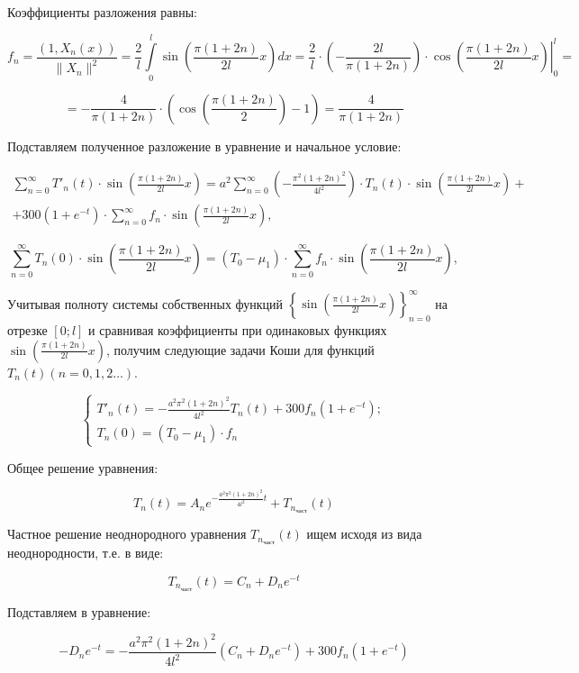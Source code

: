 Коэффициенты разложения равны:

$$f_{n} = \frac{(1, X_{n}(x))}{\|X_{n}\|^{2}} = \frac{2}{l} \int\limits_0^l \sin \left( \frac{\pi(1 + 2n)}{2l}x \right)dx = \frac{2}{l} \cdot \left( - \frac{2l}{\pi (1 + 2n)} \right) \cdot \left. \cos \left( \frac{\pi(1 + 2n)}{2l}x \right) \right|_0^l=$$

$$ = - \frac{4}{\pi(1 + 2n)} \cdot \left( \cos \left( \frac{\pi(1 + 2n)}{2} \right) - 1 \right) = \frac{4}{\pi(1 + 2n)}$$

Подставляем полученное разложение в уравнение и начальное условие:

\begin{multline*}
\sum_{n=0}^{\infty}T'_{n}(t)\cdot \sin \left( \frac{\pi(1 + 2n)}{2l}x \right) = a^{2}\sum_{n=0}^{\infty} \left( -\frac{\pi^{2}(1 + 2n)^{2}}{4l^{2}} \right) \cdot T_{n}(t) \cdot \sin \left( \frac{\pi(1 + 2n)}{2l}x \right) + \\
+ 300(1 + e^{-t}) \cdot \sum_{n=0}^{\infty} f_{n} \cdot \sin \left( \frac{\pi(1 + 2n)}{2l}x \right),
\end{multline*}

$$\sum_{n=0}^{\infty}T_{n}(0) \cdot \sin \left( \frac{\pi(1 + 2n)}{2l}x \right) = (T_{0} - \mu_{1}) \cdot \sum_{n=0}^{\infty} f_{n} \cdot \sin \left( \frac{\pi(1 + 2n)}{2l}x \right),$$

Учитывая полноту системы собственных функций $\left\{ \sin \left( \frac{\pi (1 + 2n)}{2l}x \right)  \right\}_{n=0}^{\infty}$ на отрезке $[0; l]$ и сравнивая коэффициенты при одинаковых функциях $\sin \left( \frac{\pi (1 + 2n)}{2l}x \right)$, получим следующие задачи Коши для функций $T_{n}(t) (n=0,1,2\ldots).$

$$
\begin{cases}
T'_{n}(t) = - \frac{a^{2}\pi^{2}(1 + 2n)^{2}}{4l^{2}}T_{n}(t) + 300f_{n}(1 + e^{-t});\\
T_{n}(0) = (T_{0} - \mu_{1}) \cdot f_{n}
\end{cases}
$$

Общее решение уравнения:

$$T_{n}(t) = A_{n}e^{- \frac{a^{2}\pi^{2}(1 + 2n)^{2}}{4l^{2}}t} + T_{n_{\text{част}}}(t)$$

Частное решение неоднородного уравнения $T_{n_{\text{част}}}(t)$ ищем исходя из вида неоднородности, т.е. в виде:  

$$T_{n_{\text{част}}}(t) = C_{n} + D_{n}e^{-t}$$

Подставляем в уравнение:

$$-D_{n}e^{-t} = -\frac{a^{2}\pi^{2}(1 + 2n)^{2}}{4l^{2}}\left( C_{n} + D_{n}e^{-t}\right) + 300 f_{n} (1 + e^{-t})$$

